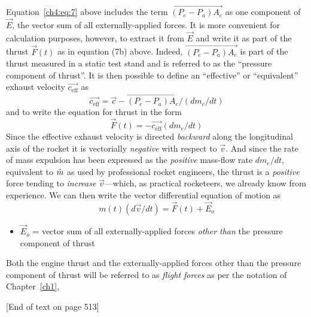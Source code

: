 Equation~\eqref{ch4:eq:7} above includes the term $\overrightarrow{(P_e - P_a)A_e}$ as one component of
$\vec{E}$, the vector sum of all externally-applied forces. It is more convenient for calculation purposes,
however, to extract it from $\vec{E}$ and write it as part of the thrust $\vec{F}(t)$ as in equation (7b)
above. Indeed, $\overrightarrow{(P_e - P_a)A_e}$ is part of the thrust measured in a static test stand and
is referred to as the ``pressure component of thrust''. It is then possible to define an ``effective'' or
``equivalent'' exhaust velocity $\overrightarrow{c_{\mathrm{eff}}}$ as
\begin{equation*}\tag{7c}
\overrightarrow{c_{\mathrm{eff}}} = \vec{c} - \overrightarrow{(P_e - P_a)A_e}/(dm_e/dt)
\end{equation*}
and to write the equation for thrust in the form
\begin{equation*}\tag{7d}
\vec{F}(t) = -\overrightarrow{c_{\mathrm{eff}}}(dm_e/dt)
\end{equation*}
Since the effective exhaust velocity is directed \emph{backward} along the longitudinal axis of the rocket
it is vectorially \emph{negative} with respect to $\vec{v}$. And since the rate of mass expulsion has been
expressed as the \emph{positive} mass-flow rate $dm_e/dt$, equivalent to $\dot{m}$ as used by professional
rocket engineers, the thrust is a \emph{positive} force tending to \emph{increase} $\vec{v}$---which, as
practical rocketeers, we already know from experience. We can then write the vector differential equation
of motion as
\begin{equation*}\tag{8}
m(t)(d\vec{v}/dt) = \vec{F}(t) + \vec{E}_o
\end{equation*}
\begin{itemize}[nosep,leftmargin=4em,labelwidth=3.5em,labelsep=0.5em,align=left]
  \item[Where] $\vec{E}_o$ = vector sum of all externally-applied forces \emph{other than} the pressure
    component of thrust
\end{itemize}
\medskip

Both the engine thrust and the externally-applied forces other than the pressure component of thrust will
be referred to as \emph{flight forces} as per the notation of Chapter~\ref{ch1},

\begin{center}
[End of text on page 513]

\end{center}

